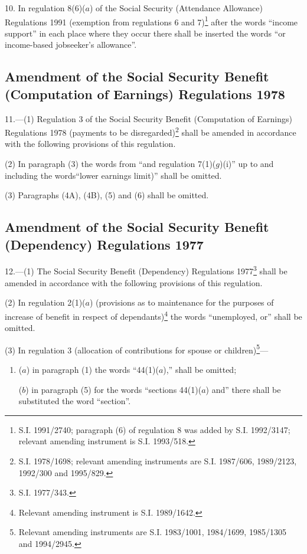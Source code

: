 \documentclass[a4paper]{article}
\begin{document}
10.  In regulation 8(6)($a$) of the Social Security (Attendance Allowance) Regulations 1991 (exemption from regulations 6 and 7)\footnote{\frenchspacing S.I. 1991/2740; paragraph (6) of regulation 8 was added by S.I. 1992/3147; relevant amending instrument is S.I. 1993/518.} after the words “income support” in each place where they occur there shall be inserted the words “or income-based jobseeker’s allowance”.

\subsection[11. Amendment of the Social Security Benefit (Computation of Earnings) Regulations 1978]{Amendment of the Social Security Benefit (Computation of Earnings) Regulations 1978}

11.—(1) Regulation 3 of the Social Security Benefit (Computation of Earnings) Regulations 1978 (payments to be disregarded)\footnote{\frenchspacing S.I. 1978/1698; relevant amending instruments are S.I. 1987/606, 1989/2123, 1992/300 and 1995/829.} shall be amended in accordance with the following provisions of this regulation.

(2) In paragraph (3) the words from “and regulation 7(1)($g$)(i)” up to and including the words“lower earnings limit)” shall be omitted.

(3) Paragraphs (4A), (4B), (5) and (6) shall be omitted.

\subsection[12. Amendment of the Social Security Benefit (Dependency) Regulations 1977]{Amendment of the Social Security Benefit (Dependency) Regulations 1977}

12.—(1) The Social Security Benefit (Dependency) Regulations 1977\footnote{\frenchspacing S.I. 1977/343.} shall be amended in accordance with the following provisions of this regulation.

(2) In regulation 2(1)($a$) (provisions as to maintenance for the purposes of increase of benefit in respect of dependants)\footnote{\frenchspacing Relevant amending instrument is S.I. 1989/1642.} the words “unemployed, or” shall be omitted.

(3) In regulation 3 (allocation of contributions for spouse or children)\footnote{\frenchspacing Relevant amending instruments are S.I. 1983/1001, 1984/1699, 1985/1305 and 1994/2945.}—
\begin{enumerate}\item[]
($a$) in paragraph (1) the words “44(1)($a$),” shall be omitted;

($b$) in paragraph (5) for the words “sections 44(1)($a$) and” there shall be substituted the word “section”.
\end{enumerate}
\end{document}
